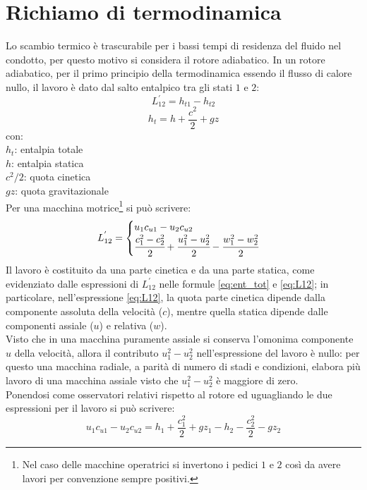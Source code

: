 \section{Richiamo di termodinamica}
Lo scambio termico è trascurabile per i bassi tempi di residenza del fluido nel condotto, per questo motivo si considera il rotore adiabatico. In un rotore adiabatico, per il primo principio della termodinamica essendo il flusso di calore nullo, il lavoro è dato dal salto entalpico tra gli stati $1$ e $2$:
\begin{equation}
L_{12}^{'} = h_{t1}-h_{t2}
\end{equation}
\begin{equation}\label{eq:ent_tot}
h_t=h+\frac{c^2}{2}+gz
\end{equation}
con: \\[1mm]
$h_t$: entalpia totale\\
$h$: entalpia statica\\
$c^2/2$: quota cinetica\\
$gz$: quota gravitazionale\\[2mm]
Per una macchina motrice\footnote{Nel caso delle macchine operatrici si invertono i pedici $1$ e $2$ così da avere lavori per convenzione sempre positivi.} si può scrivere:
\begin{equation}\label{eq:L12}
L_{12}^{'} = \begin{cases} u_1 c_{u1}-u_2 c_{u2}\\
\cfrac{c_1^2-c_2^2}{2}+\cfrac{u_1^2-u_2^2}{2}-\cfrac{w_1^2-w_2^2}{2} \end{cases}
\end{equation}
Il lavoro è costituito da una parte cinetica e da una parte statica, come evidenziato dalle espressioni di $L_{12}^{'}$ nelle formule \ref{eq:ent_tot} e \ref{eq:L12}; in particolare, nell'espressione \ref{eq:L12}, la quota parte cinetica dipende dalla componente assoluta della velocità ($c$), mentre quella statica dipende dalle componenti assiale ($u$) e relativa ($w$).\\
Visto che in una macchina puramente assiale si conserva l'omonima componente $u$ della velocità, allora il contributo $u_1^2 - u_2^2$ nell'espressione del lavoro è nullo: per questo una macchina radiale, a parità di numero di stadi e condizioni, elabora più lavoro di una macchina assiale visto che $u_1^2 - u_2^2$ è maggiore di zero.\\
Ponendosi come osservatori relativi rispetto al rotore ed uguagliando le due espressioni per il lavoro si può scrivere:
\begin{equation}
u_1 c_{u1} - u_2 c_{u2} = h_1 + \frac{c_1^2}{2}+gz_1-h_2-\frac{c_2^2}{2}-gz_2
\end{equation}
